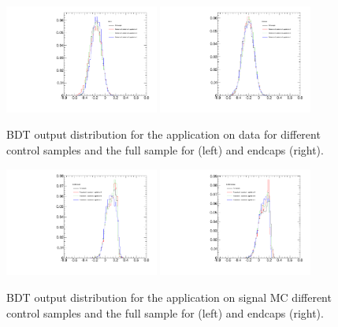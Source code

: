 \begin{figure}
  \centering
  \includegraphics[width=0.45\textwidth]{Figures/ApplicationBDTOutput_Barrel.pdf}
  \includegraphics[width=0.45\textwidth]{Figures/ApplicationBDTOutput_Endcaps.pdf}
  \caption{BDT output distribution for the application on data for different control samples and the full sample for (left) and endcaps (right).}
  \label{fig:applicationBDTOutputBarrel}
\end{figure}

\begin{figure}
  \centering
  \includegraphics[width=0.45\textwidth]{Figures/ApplicationBDTOutput_BsMCBarrel.pdf}
  \includegraphics[width=0.45\textwidth]{Figures/ApplicationBDTOutput_BsMCEndcaps.pdf}
  \caption{BDT output distribution for the application on \BsMuMu signal MC different control samples and the full sample for (left) and endcaps (right).}
  \label{fig:applicationBDTOutputEndcaps}
\end{figure}


